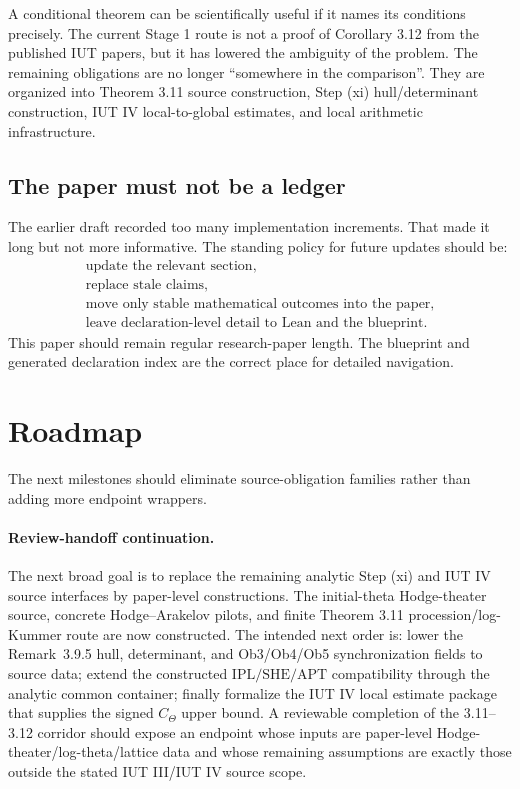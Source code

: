 \documentclass[11pt]{article}
\newcommand{\IUT}{IUT}
\newcommand{\SHE}{\ensuremath{\mathrm{SHE}}}
\newcommand{\IPL}{\ensuremath{\mathrm{IPL}}}
\newcommand{\APT}{\ensuremath{\mathrm{APT}}}
\theoremstyle{plain}
\theoremstyle{definition}
\theoremstyle{remark}
\begin{document}
A conditional theorem can be scientifically useful if it names its conditions
precisely.  The current Stage 1 route is not a proof of Corollary 3.12 from the
published \IUT{} papers, but it has lowered the ambiguity of the problem.  The
remaining obligations are no longer ``somewhere in the comparison''.  They are
organized into Theorem 3.11 source construction, Step (xi) hull/determinant
construction, \IUT{} IV local-to-global estimates, and local arithmetic
infrastructure.

\subsection{The paper must not be a ledger}

The earlier draft recorded too many implementation increments.  That made it
long but not more informative.  The standing policy for future updates should
be:
\[
\begin{array}{l}
\text{update the relevant section},\\
\text{replace stale claims},\\
\text{move only stable mathematical outcomes into the paper},\\
\text{leave declaration-level detail to Lean and the blueprint}.
\end{array}
\]
This paper should remain regular research-paper length.  The blueprint and
generated declaration index are the correct place for detailed navigation.

\section{Roadmap}

The next milestones should eliminate source-obligation families rather than
adding more endpoint wrappers.

\paragraph{Review-handoff continuation.}
The next broad goal is to replace the remaining analytic Step (xi) and
IUT IV source interfaces by paper-level constructions.  The initial-theta
Hodge-theater source, concrete Hodge--Arakelov pilots, and finite Theorem 3.11
procession/log-Kummer route are now constructed.  The intended next order is:
lower the Remark~3.9.5 hull, determinant, and Ob3/Ob4/Ob5 synchronization
fields to source data; extend the constructed \(\IPL/\SHE/\APT\)
compatibility through the analytic common container; finally formalize the IUT IV
local estimate package that supplies the signed \(C_\Theta\) upper bound.  A
reviewable completion of the 3.11--3.12 corridor should expose an endpoint whose
inputs are paper-level Hodge-theater/log-theta/lattice data and whose remaining
assumptions are exactly those outside the stated IUT III/IUT IV source scope.
\end{document}
